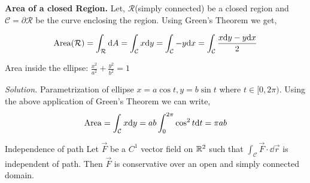 \documentclass[../Analysis-3]{subfiles}
\begin{document}
\begin{tcolorbox}
    \textbf{Area of a closed Region.} Let, $\mathcal{R}$(simply connected) be a closed region and $\mathcal{C} = \partial{\mathcal{R}}$ be the curve enclosing the region. Using Green's Theorem we get,

    \[\operatorname{Area}(\mathcal{R}) = \int_{\mathcal{R}} \dd A = \int_{\mathcal{C}} x \dd y = \int_{\mathcal{C}} -y \dd x = \int_{\mathcal{C}} \frac{x \dd y -y \dd x}{2} \]

\end{tcolorbox}

\begin{Eg}{Area inside the ellipse: $\frac{x^2}{a^2} + \frac{y^2}{b^2} = 1$}{}

    \textit{Solution.} Parametrization of ellipse $x = a \cos t, y = b \sin t$ where $t \in [0,2\pi)$. Using the above application of Green's Theorem we can write,
    \[\operatorname{Area} = \int_{\mathcal{C}} x \dd y = ab \int_{0}^{2\pi} \cos^2t \dd t = \pi ab \]
\end{Eg}

\begin{Thm}{Independence of path}{}
    Let $\vec{F}$ be a $C^1$ vector field on $\mathbb{R}^2$ such that $\displaystyle\int_{\mathcal{C}} \vec{F} \cdot \dd \vec{r}$ is independent of path. Then $\vec{F}$ is conservative over an open and simply connected domain.
\end{Thm}
\end{document}
